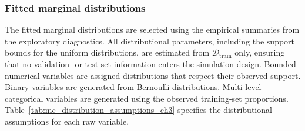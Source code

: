 \subsubsection{Fitted marginal distributions}

The fitted marginal distributions are selected using the empirical summaries
from the exploratory diagnostics.  All distributional parameters, including
the support bounds for the uniform distributions, are estimated from
$\mathcal{D}_{\mathrm{train}}$ only, ensuring that no validation- or
test-set information enters the simulation design.  Bounded numerical
variables are assigned distributions that respect their observed support.
Binary variables are generated from Bernoulli distributions.  Multi-level
categorical variables are generated using the observed training-set
proportions.  Table~\ref{tab:mc_distribution_assumptions_ch3} specifies the
distributional assumptions for each raw variable.

